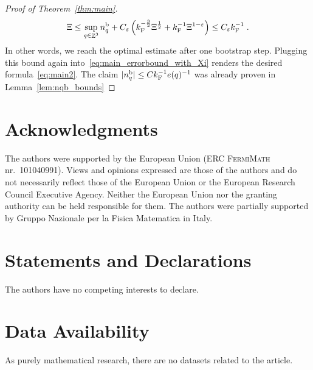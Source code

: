 \documentclass[12pt,a4paper]{article}
\numberwithin{equation}{section}
\newcommand{\1}{\mathbb{I}}
\renewcommand{\b}{\textnormal{b}}
\newcommand{\F}{\mathrm{F}}
\DeclareMathOperator{\Z}{\mathbb{Z}}
\newcommand{\half}{\frac{1}{2}}
\theoremstyle{plain}
\theoremstyle{definition}
\theoremstyle{remark}
\theoremstyle{plain}
\theoremstyle{definition}
\theoremstyle{remark}
\begin{document}
\begin{proof}[Proof of Theorem~\ref{thm:main}]
\begin{equation}
	\Xi
	\le \sup_{q \in \Z^3} n_q^{\b} + C_\varepsilon \left( k_{\F}^{-\frac{3}{2}} \Xi^\half
		+ k_{\F}^{-1}\Xi^{1-\varepsilon} \right)
	\le C_\varepsilon k_{\F}^{-1} \;.
\end{equation}
In other words, we reach the optimal estimate after one bootstrap step. Plugging this bound again into~\eqref{eq:main_errorbound_with_Xi} renders the desired formula~\eqref{eq:main2}. The claim $ |n_q^{\b}| \le C k_{\F}^{-1} e(q)^{-1} $ was already proven in Lemma~\ref{lem:nqb_bounds}
\end{proof}






\section*{Acknowledgments}
The authors were supported by the European Union (ERC \textsc{FermiMath} nr.~101040991). Views and opinions expressed are those of the authors and do not necessarily reflect those of the European Union or the European Research Council Executive Agency. Neither the European Union nor the granting authority can be held responsible for them. The authors were partially supported by Gruppo Nazionale per la Fisica Matematica in Italy.

\section*{Statements and Declarations}
The authors have no competing interests to declare.

\section*{Data Availability}
As purely mathematical research, there are no datasets related to the article.
\end{document}
